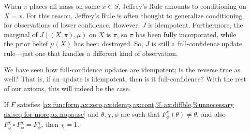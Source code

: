 \begin{enumerate}[wide, label=\textbf{\thesubsection.\arabic*}]
	When $\pi$ places all mass on some $x \in S$, Jeffrey's Rule amounts to conditioning on $X {=} x$.
	For this reason, Jeffrey's Rule is often thought to 
		generalize conditioning for observations of lower confidence.
	However, 
	$J$
	is idempotent.
	Furthermore, the marginal of
	$J((X,\pi),\mu)$
	on $X$ is $\pi$, so $\pi$ has been fully 
	incorporated, while the prior belief 
	$\mu(X)$
	has been destroyed.
	So, $J$ is still a full-confidence update rule---just 
	one that handles a different kind of observation.
\end{enumerate}


We have seen how full-confidence updates are idempotent; is the reverse true as well?
That is, if an update is idempotent, then is it full-confidence? 
With the rest of our axioms, this will indeed be the case.

\begin{prop}
	If $F$ satisfies
	\cref{ax:funcform,ax:zero,ax:idemp,ax:cont,%
		ax:diffble,%
		ax:seq-for-more,ax:nopause}
	and
 	 $\theta,\chi,\phi$ are such that 
	$F_\phi^\chi(\theta) \ne \theta$,
	and also
	$F^\chi_\phi \circ F^\chi_\phi = F^\chi_\phi$, then $\chi=1$. 
\end{prop}

% 
% 



